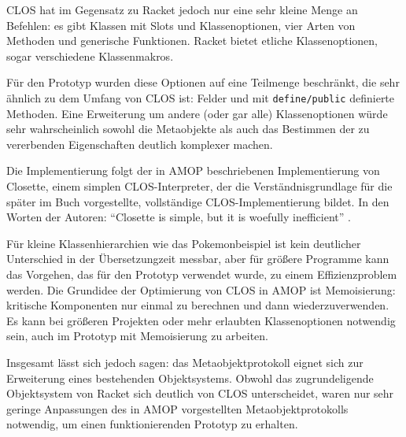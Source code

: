 CLOS hat im Gegensatz zu Racket jedoch nur eine sehr kleine Menge an Befehlen: es gibt Klassen mit Slots und Klassenoptionen, vier Arten von Methoden und generische Funktionen. Racket bietet etliche Klassenoptionen, sogar verschiedene Klassenmakros.

Für den Prototyp wurden diese Optionen auf eine Teilmenge beschränkt, die sehr ähnlich zu dem Umfang von CLOS ist: Felder und mit \texttt{define/public} definierte Methoden. Eine Erweiterung um andere (oder gar alle) Klassenoptionen würde sehr wahrscheinlich sowohl die Metaobjekte als auch das Bestimmen der zu vererbenden Eigenschaften deutlich komplexer machen. 

Die Implementierung folgt der in AMOP beschriebenen Implementierung von Closette, einem simplen CLOS-Interpreter, der die Verständnisgrundlage für die später im Buch vorgestellte, vollständige CLOS-Implementierung bildet. In den Worten der Autoren: ``Closette is simple, but it is woefully inefficient'' \cite[S.45]{amop}. 

Für kleine Klassenhierarchien wie das Pokemonbeispiel ist kein deutlicher Unterschied in der Übersetzungzeit messbar, aber für größere Programme kann das Vorgehen, das für den Prototyp verwendet wurde, zu einem Effizienzproblem werden. Die Grundidee der Optimierung von CLOS in AMOP ist Memoisierung: kritische Komponenten nur einmal zu berechnen und dann wiederzuverwenden. Es kann bei größeren Projekten oder mehr erlaubten Klassenoptionen notwendig sein, auch im Prototyp mit Memoisierung zu arbeiten.

Insgesamt lässt sich jedoch sagen: das Metaobjektprotokoll eignet sich zur Erweiterung eines bestehenden Objektsystems. Obwohl das zugrundeligende Objektsystem von Racket sich deutlich von CLOS unterscheidet, waren nur sehr geringe Anpassungen des in AMOP vorgestellten Metaobjektprotokolls notwendig, um einen funktionierenden Prototyp zu erhalten.